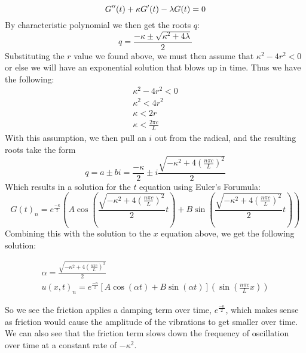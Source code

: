 \documentclass{article}
\begin{document}
\begin{equation}
G''(t) + \kappa G'(t) - \lambda G(t)=0\\
\end{equation}
By characteristic polynomial we then get the roots $q$:
\begin{equation}
q = \frac{-\kappa \pm \sqrt{\kappa^2 + 4\lambda}}{2}
\end{equation}
Substituting the $r$ value we found above, we must then assume that $\kappa^2 - 4r^2 < 0$ or else we will have an exponential solution that blows up in time. Thus we have the following:
\begin{equation}
\begin{aligned}
\kappa^2 - 4r^2 < 0\\
\kappa^2 < 4r^2\\
\kappa < 2r\\
\kappa < \frac{2\pi c}{L}
\end{aligned}
\end{equation}
With this assumption, we then pull an $i$ out from the radical, and the resulting roots take the form 
\begin{equation}
q = a \pm bi = \frac{-\kappa}{2} \pm i \frac{\sqrt{-\kappa^2 + 4(\frac{n\pi c}{L})^2}}{2} 
\end{equation}
Which results in a solution for the $t$ equation using Euler's Forumula:
\begin{equation}
G(t)_n = e^{\frac{-\kappa}{2}}(A\cos( \frac{\sqrt{-\kappa^2 + 4(\frac{n\pi c}{L})^2}}{2}t) + B\sin( \frac{\sqrt{-\kappa^2 + 4(\frac{n\pi c}{L})^2}}{2}t))
\end{equation}
Combining this with the solution to the $x$ equation above, we get the following solution:
\begin{tcolorbox}[minipage,colback=white,arc=0pt,outer arc=0pt]
\begin{equation}
\begin{aligned}
\alpha = \frac{\sqrt{-\kappa^2 + 4(\frac{n\pi c}{L})^2}}{2}\\
u(x,t)_n = e^{\frac{-\kappa}{2}}[A\cos( \alpha t) + B\sin( \alpha t)](\sin(\frac{n\pi c}{L}x))
\end{aligned}
\end{equation}
\end{tcolorbox}
So we see the friction applies a damping term over time, $e^{\frac{-\kappa}{2}}$, which makes sense as friction would cause the amplitude of the vibrations to get smaller over time. We can also see that the friction term slows down the frequency of oscillation over time at a constant rate of $-\kappa^2$.\\
\end{document}
